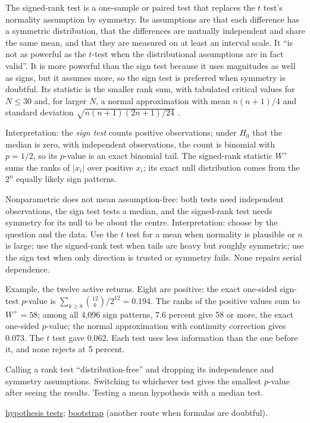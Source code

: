 \begin{qfmethod}\label{meth:nonparametric-tests}
 The signed-rank test is a one-sample or paired test that replaces the $t$ test's normality assumption by symmetry. Its assumptions are that each difference has a symmetric distribution, that the differences are mutually independent and share the same mean, and that they are measured on at least an interval scale. It ``is not as powerful as the $t$-test when the distributional assumptions are in fact valid''. It is more powerful than the sign test because it uses magnitudes as well as signs, but it assumes more, so the sign test is preferred when symmetry is doubtful. Its statistic is the smaller rank sum, with tabulated critical values for $N\le30$ and, for larger $N$, a normal approximation with mean $n(n+1)/4$ and standard deviation $\sqrt{n(n+1)(2n+1)/24}$ \citep[``Signed Rank Test'']{signed-rank-test-reference-2023}.

 Interpretation: the \emph{sign test} counts positive observations; under $H_0$ that the median is zero, with independent observations, the count is binomial with $p=1/2$, so its $p$-value is an exact binomial tail. The signed-rank statistic $W^+$ sums the ranks of $|x_i|$ over positive $x_i$; its exact null distribution comes from the $2^n$ equally likely sign patterns.

 Nonparametric does not mean assumption-free: both tests need independent observations, the sign test tests a median, and the signed-rank test needs symmetry for its null to be about the centre. Interpretation: choose by the question and the data. Use the $t$ test for a mean when normality is plausible or $n$ is large; use the signed-rank test when tails are heavy but roughly symmetric; use the sign test when only direction is trusted or symmetry fails. None repairs serial dependence.

 Example, the twelve active returns. Eight are positive: the exact one-sided sign-test $p$-value is $\sum_{k\ge8}\binom{12}k/2^{12}=0.194$. The ranks of the positive values sum to $W^+=58$; among all 4{,}096 sign patterns, 7.6 percent give 58 or more, the exact one-sided $p$-value; the normal approximation with continuity correction gives 0.073. The $t$ test gave 0.062. Each test uses less information than the one before it, and none rejects at 5 percent.

 Calling a rank test ``distribution-free'' and dropping its independence and symmetry assumptions. Switching to whichever test gives the smallest $p$-value after seeing the results. Testing a mean hypothesis with a median test.

 \hyperref[meth:hypothesis-testing]{hypothesis tests}; \hyperref[meth:bootstrap-resampling]{bootstrap} (another route when formulas are doubtful).

\end{qfmethod}

